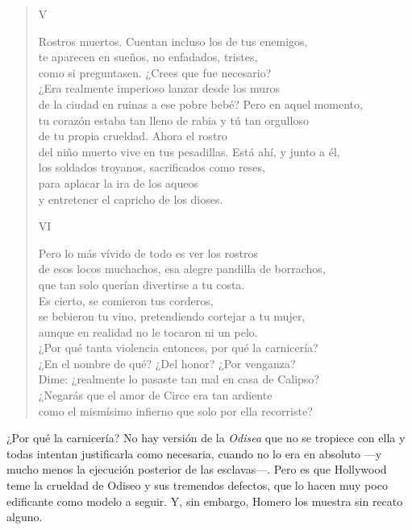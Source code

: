 \documentclass[11pt,a4paper]{article}
\begin{document}
\begin{verse}
V

Rostros muertos. Cuentan incluso los de tus enemigos,\\
te aparecen en sueños, no enfadados, tristes,\\
como si preguntasen. ¿Crees que fue necesario?\\
¿Era realmente imperioso lanzar desde los muros\\
de la ciudad en ruinas a ese pobre bebé? Pero en aquel momento,\\
tu corazón estaba tan lleno de rabia y tú tan orgulloso\\
de tu propia crueldad. Ahora el rostro\\
del niño muerto vive en tus pesadillas. Está ahí, y junto a él,\\
los soldados troyanos, sacrificados como reses,\\
para aplacar la ira de los aqueos\\
y entretener el capricho de los dioses.

VI

Pero lo más vívido de todo es ver los rostros\\
de esos locos muchachos, esa alegre pandilla de borrachos,\\
que tan solo querían divertirse a tu costa.\\
Es cierto, se comieron tus corderos,\\
se bebieron tu vino, pretendiendo cortejar a tu mujer,\\
aunque en realidad no le tocaron ni un pelo.\\
¿Por qué tanta violencia entonces, por qué la carnicería?\\
¿En el nombre de qué? ¿Del honor? ¿Por venganza?\\
Dime: ¿realmente lo pasaste tan mal en casa de Calipso?\\
¿Negarás que el amor de Circe era tan ardiente\\
como el mismísimo infierno que solo por ella recorriste?
\end{verse}

¿Por qué la carnicería? No hay versión de la \emph{Odisea} que no se tropiece con ella y todas intentan justificarla como necesaria, cuando no lo era en absoluto ---y mucho menos la ejecución posterior de las esclavas---. Pero es que Hollywood teme la crueldad de Odiseo y sus tremendos defectos, que lo hacen muy poco edificante como modelo a seguir. Y, sin embargo, Homero los muestra sin recato alguno.
\end{document}
